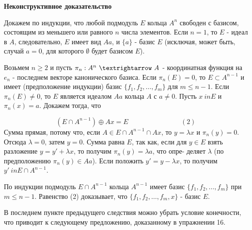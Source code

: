\documentclass{mai_book}
\begin{document}
	\noindent
	{\bf Неконструктивное доказательство}
	
	Докажем по индукции, что любой подмодуль $E$ кольца $A^{n}$ свободен\linebreak
	с базисом, состоящим из меньшего или равного $n$ числа элементов.\linebreak
	Если $n = 1$, то $E$ - идеал в $A$, следовательно, $E$ имеет вид $Aa$, и\linebreak
	$\{a\}$ - базис $E$ (исключая, может быть, случай $a = 0$, для которого $\emptyset$\linebreak
	будет базисом $E$).
	
	Возьмем $n\geqslant 2$ и пусть $\pi_{n}:A^{n} \ \textrightarrow \ A$ - координатная функция\linebreak
	на $e_n$ - последнем векторе канонического базиса. Если $\pi_{n}(E) = 0$, то\linebreak
	$E\subset A^{n - 1}$ и  имеет (предположение индукции) базис $\{f_1, f_2, \ldots, f_m\}$ для\linebreak
	$m\leqslant n - 1$. Если $\pi_{n}(E) \neq 0$, то $E$ является идеалом $Aa$ кольца $A$ с $a \neq 0$.\linebreak
	Пусть $x \ in E$ и $\pi_{n}(x) = a$. Докажем тогда, что
	
	$$(E \cap A^{n - 1}) \oplus Ax = E \ \ \ \ \ \ \ \ \ \ \ \ \ \ \ \ \ \ \ \ \ \ \ \ \ \ \ \ \ \ \ \ \ \ \ (2)$$
	Сумма прямая, потому что, если $A \in E \cap A^{n - 1} \cap Ax$, то $y = \lambda x$ и\linebreak
	$\pi_{n}(y) = 0$. Отсюда $\lambda = 0$, затем $y = 0$. Сумма равна $E$, так как, если для\linebreak
	$y \in E$ взять разложение $y = y' + \lambda x$, то получим $\pi_{n}(y) = \lambda a$, что опре-\linebreak
	деляет $\lambda$ (по предположению $\pi_{n}(y) \in Aa$). Если положить $y' = y - \lambda x$,\linebreak
	то получим $y' \ in E \cap A^{n - 1}$.
	
	По индукции подмодуль $E \cap A^{n - 1}$ кольца $A^{n - 1}$ имеет базис\linebreak
	$\{f_1, f_2, \ldots, f_m\}$ при $m \leqslant n - 1$. Равенство (2) доказывает, что\linebreak
	$\{f_1, f_2, \ldots, f_m, x\}$ - базис $E$.
	
	В последнем пункте предыдущего следствия можно убрать условие\linebreak
	конечности, что приводит к следующему предложению, доказанному в\linebreak
	упражнении 16.
	
\end{document}
